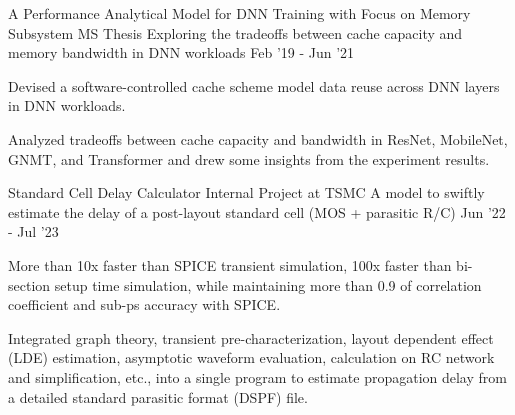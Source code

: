 

\begin{cventries}
    \cvproject
    {A Performance Analytical Model for DNN Training with Focus on Memory Subsystem}
    {MS Thesis}
    {Exploring the tradeoffs between cache capacity and memory bandwidth in DNN workloads}
    {Feb '19 - Jun '21}
    {
        \begin{cvitems}
        \item Devised a software-controlled cache scheme model data reuse across DNN layers in DNN workloads.
        \item Analyzed tradeoffs between cache capacity and bandwidth in ResNet, MobileNet, GNMT, and Transformer and drew some insights from the experiment results.
        \end{cvitems}
    }

    \cvproject
    {Standard Cell Delay Calculator}
    {Internal Project at TSMC}
    {A model to swiftly estimate the delay of a post-layout standard cell (MOS + parasitic R/C)}
    {Jun '22 - Jul '23}
    {
        \begin{cvitems}
        \item More than 10x faster than SPICE transient simulation, 100x faster than bi-section setup time simulation, while maintaining more than 0.9 of correlation coefficient and sub-ps accuracy with SPICE.
        \item Integrated graph theory, transient pre-characterization, layout dependent effect (LDE) estimation, asymptotic waveform evaluation, calculation on RC network and simplification, etc., into a single program to estimate propagation delay from a detailed standard parasitic format (DSPF) file.
        \end{cvitems}
    }
\end{cventries}
